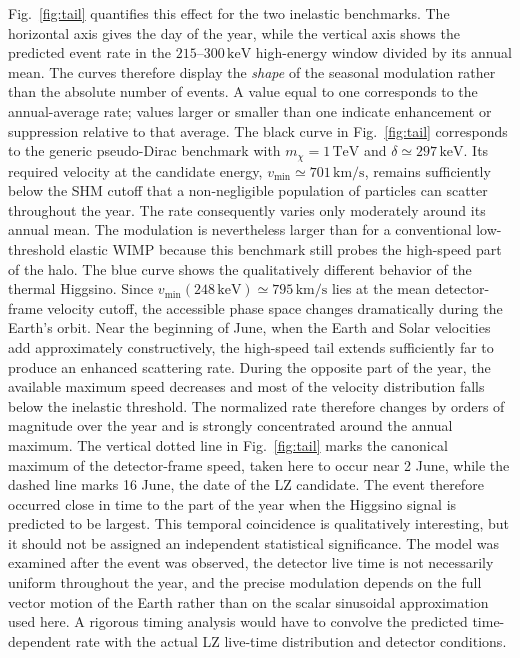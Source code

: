 \documentclass[aps,prd,reprint,superscriptaddress,nofootinbib,longbibliography,floatfix]{revtex4-2}
\newcommand{\TeV}{\mathrm{TeV}}
\newcommand{\keV}{\mathrm{keV}}
\begin{document}
Fig.~\ref{fig:tail} quantifies this effect for the two inelastic benchmarks. The horizontal axis gives the day of the year, while the vertical axis shows the predicted event rate in the $215$--$300\,\keV$ high-energy window divided by its annual mean. The curves therefore display the \emph{shape} of the seasonal modulation rather than the absolute number of events. A value equal to one corresponds to the annual-average rate; values larger or smaller than one indicate enhancement or suppression relative to that average.
The black curve in Fig.~\ref{fig:tail} corresponds to the generic pseudo-Dirac benchmark with $m_\chi=1\,\TeV$ and $\delta\simeq297\,\keV$. Its required velocity at the candidate energy, $v_{\min}\simeq701\,\mathrm{km/s}$, remains sufficiently below the SHM cutoff that a non-negligible population of particles can scatter throughout the year. The rate consequently varies only moderately around its annual mean. The modulation is nevertheless larger than for a conventional low-threshold elastic WIMP because this benchmark still probes the high-speed part of the halo.
The blue curve shows the qualitatively different behavior of the thermal Higgsino. Since $v_{\min}(248\,\keV)\simeq795\,\mathrm{km/s}$ lies at the mean detector-frame velocity cutoff, the accessible phase space changes dramatically during the Earth's orbit. Near the beginning of June, when the Earth and Solar velocities add approximately constructively, the high-speed tail extends sufficiently far to produce an enhanced scattering rate. During the opposite part of the year, the available maximum speed decreases and most of the velocity distribution falls below the inelastic threshold. The normalized rate therefore changes by orders of magnitude over the year and is strongly concentrated around the annual maximum.
The vertical dotted line in Fig.~\ref{fig:tail} marks the canonical maximum of the detector-frame speed, taken here to occur near 2 June, while the dashed line marks 16 June, the date of the LZ candidate. The event therefore occurred close in time to the part of the year when the Higgsino signal is predicted to be largest. This temporal coincidence is qualitatively interesting, but it should not be assigned an independent statistical significance. The model was examined after the event was observed, the detector live time is not necessarily uniform throughout the year, and the precise modulation depends on the full vector motion of the Earth rather than on the scalar sinusoidal approximation used here. A rigorous timing analysis would have to convolve the predicted time-dependent rate with the actual LZ live-time distribution and detector conditions.
\end{document}
